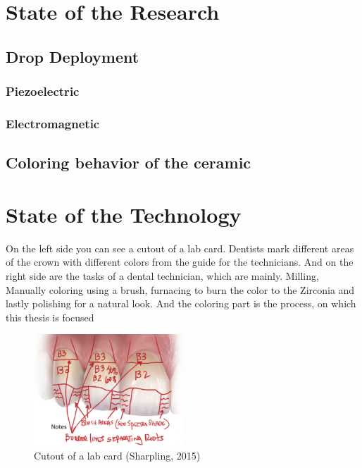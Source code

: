 \chapter{State of the Research}
\label{sec:stand_forschung}

\section{Drop Deployment}


\subsection{Piezoelectric}


\subsection{Electromagnetic}
\label{sec:freiheitsgrad_eines_getriebes}




\section{Coloring behavior of the ceramic}
\label{sec:grundlagen_für_die_kinematischen_betrachtungen}


\chapter{State of the Technology}
\label{sec:stand_technik}
On the left side you can see a cutout of a lab card. Dentists mark different areas of the crown with different colors from the guide for the technicians.
And on the right side are the tasks of a dental technician, which are mainly. Milling, Manually coloring using a brush, furnacing to burn the color to the Zirconia and lastly polishing for a natural look.
And the coloring part is the process, on which this thesis is focused 
\begin{figure}[h]
	\centering
	\includegraphics[width=0.5\textwidth]{grafiken/lab_card.png}
	\caption{Cutout of a lab card (Sharpling, 2015)}
	\label{fig:bild2}
\end{figure}



